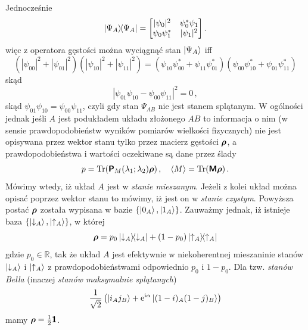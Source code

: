 \documentclass{myclass}
\begin{document}
Jednocześnie
\begin{equation*}
    \dyad{\Psi_A} = \mqty[|\psi_0|^2 & \psi_0^*\psi_1 \\ \psi_0\psi_1^* & |\psi_1|^2]\,.
\end{equation*}
więc z operatora gęstości można wyciągnąć stan \(\ket{\Psi_A}\) iff
\begin{equation*}
    (|\psi_{00}|^2 + |\psi_{01}|^2)(|\psi_{10}|^2 + |\psi_{11}|^2) = (\psi_{10}\psi_{00}^* + \psi_{11}\psi_{01}^*)(\psi_{00}\psi_{10}^* + \psi_{01}\psi_{11}^*)
\end{equation*}
skąd
\begin{equation*}
    |\psi_{01}\psi_{10} - \psi_{00}\psi_{11}|^2 = 0\,,
\end{equation*}
skąd \(\psi_{01}\psi_{10} = \psi_{00}\psi_{11}\), czyli gdy stan \(\Psi_{AB}\) nie jest stanem
splątanym. W ogólności jednak jeśli \(A\) jest podukładem układu złożonego \(AB\) to informacja o
nim (w sensie prawdopodobieństw wyników pomiarów wielkości fizycznych) nie jest opisywana przez
wektor stanu tylko przez macierz gęstości \(\boldsymbol{\mathsf{\rho}}\), a prawdopodobieństwa i wartości
oczekiwane są dane przez ślady
\begin{equation*}
    p = \Trace(\oper{P}_M(\lambda_1;\lambda_2)\oper{\rho})\,,\quad \expval{M} = \Trace(\oper{M}\oper{\rho})\,.
\end{equation*}
Mówimy wtedy, iż układ \(A\) jest w \textit{stanie mieszanym}. Jeżeli z kolei układ można opisać
poprzez wektor stanu to mówimy, iż jest on w \textit{stanie czystym}. Powyższa postać
\(\boldsymbol{\mathsf{\rho}}\) została wypisana w bazie \(\{\ket{0_A}, \ket{1_A}\}\). Zauważmy jednak, iż istnieje
baza \(\{\ket{\downarrow_A}, \ket{\uparrow_A}\}\), w której
\begin{equation*}
    \oper{\rho} = p_0\dyad{\downarrow_A} + (1-p_0)\dyad{\uparrow_A}
\end{equation*}
gdzie \(p_0\in\mathbb{R}\), tak że układ \(A\) jest efektywnie w niekoherentnej mieszaninie stanów
\(\ket{\downarrow_A}\) i \(\ket{\uparrow_A}\) z prawdopodobieństwami odpowiednio \(p_0\) i
\(1-p_0\). Dla tzw. \textit{stanów Bella} (inaczej \textit{stanów maksymalnie splątanych})
\begin{equation*}
    \frac{1}{\sqrt{2}}\left(\ket{i_Aj_B} + \mathrm{e}^{\mathrm{i}\alpha}\ket{(1-i)_A(1-j)_B}\right)
\end{equation*}
mamy \(\boldsymbol{\mathsf{\rho}} = \frac{1}{2}\boldsymbol{\mathsf{1}}\).
\end{document}
